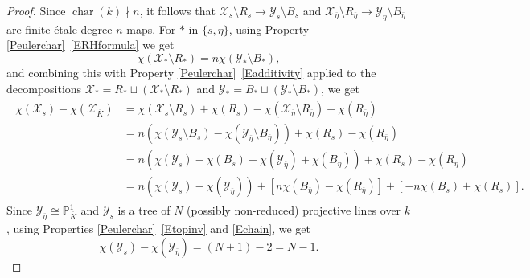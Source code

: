 \documentclass[12pt]{amsart}
\numberwithin{equation}{section}
\theoremstyle{definition}
\newcommand{\mc}[1]{\mathcal{#1}}
\renewcommand{\P}{\mathbb P}
\DeclareMathOperator{\cha}{char}
\begin{document}
\begin{proof}
Since $\cha(k) \nmid n$, it follows that $\mc{X}_s \setminus R_s \rightarrow \mc{Y}_s \setminus B_s$ and $\mc{X}_{\overline{\eta}} \setminus R_{\overline{\eta}} \rightarrow \mc{Y}_{\overline{\eta}} \setminus B_{\overline{\eta}}$ are finite \'{e}tale degree $n$ maps. For $*$ in $\{ s, \overline{\eta} \}$, using Property \ref{Peulerchar}~\ref{ERHformula} we get
\begin{equation*}
 \chi(\mc{X}_* \setminus R_*) = n \chi(\mc{Y}_* \setminus B_*), 
\end{equation*}
and combining this with Property \ref{Peulerchar}~\ref{Eadditivity} applied to the decompositions $\mc{X}_* = R_* \sqcup (\mc{X}_* \setminus R_*)$ and $\mc{Y}_* = B_* \sqcup (\mc{Y}_* \setminus B_*)$, we get
\begin{align}\label{Eeulerdiff1}
\begin{split}
 \chi(\mc{X}_s)-\chi(\mc{X}_{\overline{K}}) &= \chi(\mc{X}_s \setminus R_s)+\chi(R_s)-\chi(\mc{X}_{\overline{\eta}} \setminus R_{\overline{\eta}})-\chi(R_{\overline{\eta}}) \\
 &= n(\chi(\mc{Y}_s \setminus B_s) - \chi(\mc{Y}_{\overline{\eta}} \setminus B_{\overline{\eta}}))+\chi(R_s)-\chi(R_{\overline{\eta}}) \\
 &= n(\chi(\mc{Y}_s)-\chi(B_s) - \chi(\mc{Y}_{\overline{\eta}})+\chi(B_{\overline{\eta}}))+\chi(R_s)-\chi(R_{\overline{\eta}}) \\ 
 &=  n(\chi(\mc{Y}_s)-\chi(\mc{Y}_{\overline{\eta}}))+\left[ n\chi(B_{\overline{\eta}}) -\chi(R_{\overline{\eta}}) \right]+ \left[-n\chi(B_s)+\chi(R_s)\right].
\end{split}
 \end{align}
Since $\mc{Y}_{\overline{\eta}} \cong \P^1_{\overline{K}}$ and
$\mc{Y}_s$ is a tree of $N$ (possibly
non-reduced) projective lines over $k$, using Properties \ref{Peulerchar}~\ref{Etopinv} and \ref{Echain}, we get
\begin{equation}\label{Echinumberofcomp}
 \chi(\mc{Y}_s)-\chi(\mc{Y}_{\overline{\eta}}) = \left( N+1 \right)-2 = N-1.
\end{equation}


\end{proof}
\end{document}
